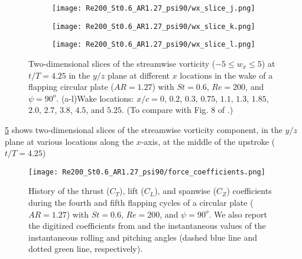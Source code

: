 \begin{figure}[H]
\begin{subfigure}[t]{0.24\textwidth}
    \caption{}
    \label{fig:baseline_wx_slices:i}
  \end{subfigure}
  \begin{subfigure}[t]{0.24\textwidth}
    \centering
    \texttt{[image: Re200\_St0.6\_AR1.27\_psi90/wx\_slice\_j.png]}
    \caption{}
    \label{fig:baseline_wx_slices:j}
  \end{subfigure}
  \begin{subfigure}[t]{0.24\textwidth}
    \centering
    \texttt{[image: Re200\_St0.6\_AR1.27\_psi90/wx\_slice\_k.png]}
    \caption{}
    \label{fig:baseline_wx_slices:k}
  \end{subfigure}
  \begin{subfigure}[t]{0.24\textwidth}
    \centering
    \texttt{[image: Re200\_St0.6\_AR1.27\_psi90/wx\_slice\_l.png]}
    \caption{}
    \label{fig:baseline_wx_slices:l}
  \end{subfigure}
  \caption{Two-dimensional slices of the streamwise vorticity ($-5 \leq w_x \leq 5$) at $t / T = 4.25$ in the $y/z$ plane at different $x$ locations in the wake of a flapping circular plate ($AR = 1.27$) with $St = 0.6$, $Re = 200$, and $\psi = 90^o$. (a-l)Wake locations: $x / c = 0$, $0.2$, $0.3$, $0.75$, $1.1$, $1.3$, $1.85$, $2.0$, $2.7$, $3.8$, $4.5$, and $5.25$. (To compare with Fig. 8 of \citet{li_dong_2016}.)}
  \label{fig:baseline_wx_slices}
\end{figure}

\cref{fig:baseline_wx_slices} shows two-dimensional slices of the streamwise vorticity component, in the $y/z$ plane at various locations along the $x$-axis, at the middle of the upstroke ($t/T = 4.25$)

\begin{figure}[!h]
  \centering
  \texttt{[image: Re200\_St0.6\_AR1.27\_psi90/force\_coefficients.png]}
  \caption{History of the thrust ($C_T$), lift ($C_L$), and spanwise ($C_Z$) coefficients during the fourth and fifth flapping cycles of a circular plate ($AR = 1.27$) with $St = 0.6$, $Re = 200$, and $\psi = 90^o$. We also report the digitized coefficients from \cite{li_dong_2016} and the instantaneous values of the instantaneous rolling and pitching angles (dashed blue line and dotted green line, respectively).}
  \label{fig:baseline_force_coefficients}
\end{figure}

